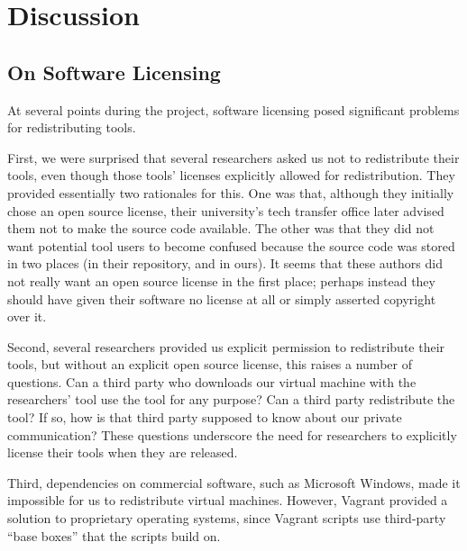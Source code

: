\documentclass[10pt,conference]{IEEEtran}
\begin{document}
\section{Discussion}


\subsection{On Software Licensing}

At several points during the project, software licensing posed significant
problems for redistributing tools.

First, we were surprised that several researchers asked us not to redistribute
their tools, even though those tools' licenses explicitly allowed for redistribution.
They provided essentially two rationales for this.
One was that, although they initially chose an open source license, 
their university's tech transfer office later advised them not to make the source code available.
The other was that they did not want potential tool users to become confused 
because the source code was stored in two places (in their repository, and in ours).
It seems that these authors did not really want an open source license
in the first place; perhaps instead they should have given their software
no license at all or simply asserted copyright over it.

Second, several researchers provided us explicit permission to redistribute their tools,
but without an explicit open source license, this raises a number of questions.
Can a third party who downloads our virtual machine with the researchers' tool use the tool for any purpose?
Can a third party redistribute the tool?
If so, how is that third party supposed to know about our private communication?
These questions underscore the need for researchers to explicitly license their tools
when they are released.

Third, dependencies on commercial software, such as Microsoft Windows, made it
impossible for us to redistribute virtual machines.
However, Vagrant provided a solution to proprietary operating systems, 
since Vagrant scripts use third-party ``base boxes''
that the scripts build on.
\end{document}
